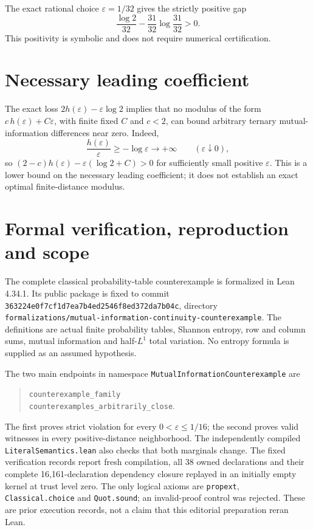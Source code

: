 \documentclass[11pt,a4paper]{article}
\newcommand{\eps}{\varepsilon}
\begin{document}
The exact rational choice $\eps=1/32$ gives the strictly positive gap
\begin{equation}
\frac{\log2}{32}-\frac{31}{32}\log\frac{31}{32}>0.
\end{equation}
This positivity is symbolic and does not require numerical certification.

\section{Necessary leading coefficient}
The exact loss $2h(\eps)-\eps\log2$ implies that no modulus of the form $c\,h(\eps)+C\eps$, with finite fixed $C$ and $c<2$, can bound arbitrary ternary mutual-information differences near zero. Indeed,
\begin{equation}
\frac{h(\eps)}{\eps}\ge-\log\eps\longrightarrow+\infty\qquad(\eps\downarrow0),
\end{equation}
so $(2-c)h(\eps)-\eps(\log2+C)>0$ for sufficiently small positive $\eps$. This is a lower bound on the necessary leading coefficient; it does not establish an exact optimal finite-distance modulus.

\section{Formal verification, reproduction and scope}
The complete classical probability-table counterexample is formalized in
Lean 4.34.1. Its public package is fixed to commit
\nolinkurl{363224e0f7cf1d7ea7b4ed2546f8ed372da7b04c}, directory
\nolinkurl{formalizations/mutual-information-continuity-counterexample}.
The definitions are actual finite probability tables, Shannon entropy,
row and column sums, mutual information and half-$L^1$ total variation.
No entropy formula is supplied as an assumed hypothesis.

The two main endpoints in namespace
\nolinkurl{MutualInformationCounterexample} are
\begin{quote}\small
\nolinkurl{counterexample_family}\\
\nolinkurl{counterexamples_arbitrarily_close}.
\end{quote}
The first proves strict violation for every $0<\eps\le1/16$; the second
proves valid witnesses in every positive-distance neighborhood. The
independently compiled \nolinkurl{LiteralSemantics.lean} also checks that
both marginals change.
The fixed verification records report fresh compilation, all 38 owned
declarations and their complete 16,161-declaration dependency closure
replayed in an initially empty kernel at trust level zero. The only logical
axioms are \texttt{propext}, \texttt{Classical.choice} and \texttt{Quot.sound};
an invalid-proof control was rejected. These are prior execution records,
not a claim that this editorial preparation reran Lean.
\end{document}
